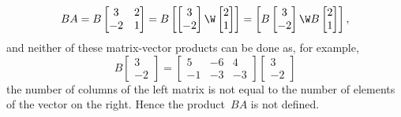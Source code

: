 \begin{example}
\begin{equation*}
BA=B\begin{bmatrix} 3 & 2\\ -2 & 1 \end{bmatrix}
=B\begin{bmatrix} \begin{bmatrix} 3 \\ -2 \end{bmatrix}\W 
\begin{bmatrix} 2 \\ 1 \end{bmatrix} \end{bmatrix}
=\begin{bmatrix} B\begin{bmatrix} 3 \\ -2 \end{bmatrix}\W 
B\begin{bmatrix} 2 \\ 1 \end{bmatrix} \end{bmatrix},
\end{equation*}
and neither of these matrix-vector products can be done as, for example,
\begin{equation*}
B\begin{bmatrix} 3 \\ -2 \end{bmatrix}
=\begin{bmatrix} 5 & -6 & 4\\ -1 & -3 & -3 \end{bmatrix}
\begin{bmatrix} 3 \\ -2 \end{bmatrix}
\end{equation*}
the number of columns of the left matrix is not equal to the number of elements of the vector on the right.
Hence the product~\(BA\) is not defined.
\end{example}




